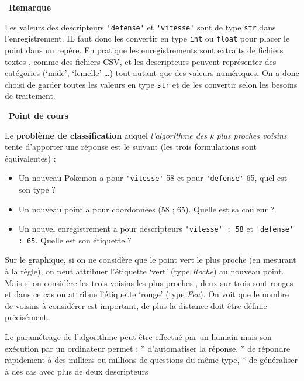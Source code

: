 \documentclass[
  11pt,
]{article}
\newcommand{\passthrough}[1]{#1}
\providecommand{\tightlist}{%
  \setlength{\itemsep}{0pt}\setlength{\parskip}{0pt}}
\newcounter{thme}
\newcounter{rque}
\newenvironment{remarque}
{\par \medskip    \addtocounter{rque}{1} \noindent  
\begin{bclogo}[arrondi =0.1,  ombre = true, barre=snake, noborder = true, logo=\bcinfo, marge=0]{~\textbf{Remarque} \textbf{\therque}}  \par }
{
\end{bclogo}
 \par \bigskip }
\newcounter{def}
\newcounter{cours}
\newenvironment{cours}[1]
{\par \medskip   \addtocounter{cours}{1} \noindent  
\begin{bclogo}[arrondi =0.1,  ombre = true, barre=none, logo=\bcbook, marge=4]{~\textbf{Point de cours} \textbf{\thecours} {\itshape #1} }  \par}
{
\end{bclogo}
 \par \bigskip }
\newcounter{alg}
\begin{document}
\begin{remarque}{}

Les valeurs des descripteurs \passthrough{\lstinline!'defense'!} et
\passthrough{\lstinline!'vitesse'!} sont de type
\passthrough{\lstinline!str!} dans l'enregistrement. IL faut donc les
convertir en type \passthrough{\lstinline!int!} ou
\passthrough{\lstinline!float!} pour placer le point dans un repère. En
pratique les enregistrements sont extraits de fichiers textes , comme
des fichiers
\href{https://fr.wikipedia.org/wiki/Comma-separated_values}{CSV}, et les
descripteurs peuvent représenter des catégories (`mâle', `femelle'
\ldots) tout autant que des valeurs numériques. On a donc choisi de
garder toutes les valeurs en type \passthrough{\lstinline!str!} et de
les convertir selon les besoins de traitement.

\end{remarque}

\begin{cours}{}

Le \textbf{problème de classification} auquel \emph{l'algorithme des k
plus proches voisins} tente d'apporter une réponse est le suivant (les
trois formulations sont équivalentes) :

\begin{itemize}
\tightlist
\item
  Un nouveau Pokemon a pour \passthrough{\lstinline!'vitesse'!} 58 et
  pour \passthrough{\lstinline!'defense'!} 65, quel est son type ?
\item
  Un nouveau point a pour coordonnées (58 ; 65). Quelle est sa couleur ?
\item
  Un nouvel enregistrement a pour descripteurs
  \passthrough{\lstinline!'vitesse' : 58!} et
  \passthrough{\lstinline!'defense' : 65!}. Quelle est son étiquette ?
\end{itemize}

Sur le graphique, si on ne considère que le point vert le plus proche
(en mesurant à la règle), on peut attribuer l'étiquette `vert' (type
\emph{Roche}) au nouveau point. Mais si on considère les trois voisins
les plus proches , deux sur trois sont rouges et dans ce cas on attribue
l'étiquette `rouge' (type \emph{Feu}). On voit que le nombre de voisins
à considérer est important, de plus la distance doit être définie
précisément.

Le paramétrage de l'algorithme peut être effectué par un humain mais son
exécution par un ordinateur permet : * d'automatiser la réponse, * de
répondre rapidement à des milliers ou millions de questions du même
type, * de généraliser à des cas avec plus de deux descripteurs

\end{cours}
\end{document}
